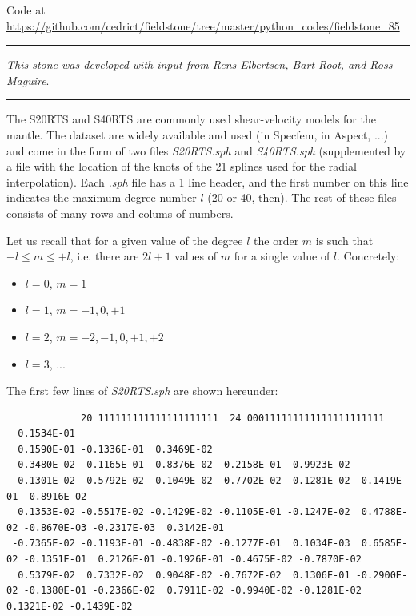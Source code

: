 
\begin{center}
Code at \url{https://github.com/cedrict/fieldstone/tree/master/python_codes/fieldstone_85}
\end{center}

\par\noindent\rule{\textwidth}{0.4pt}

{\sl This stone was developed with input from Rens Elbertsen, Bart Root, and Ross Maguire}. 

\par\noindent\rule{\textwidth}{0.4pt}

\vspace{1cm}



The S20RTS \cite{rivw99} and S40RTS \cite{ridv11} are commonly used shear-velocity models for the mantle.
The dataset are widely available and used (in Specfem, in Aspect, ...) and come in the form of two 
files {\sl S20RTS.sph} and {\sl S40RTS.sph} (supplemented by a file with the location of the knots of the 21 splines
used for the radial interpolation). 
Each {\sl .sph} file has a 1 line header, and the first number on this line indicates the maximum degree number $l$ 
(20 or 40, then). The rest of these files consists of many rows and colums of numbers.

Let us recall that for a given value of the degree $l$ the order $m$ is such that $-l \le m \le +l$, i.e. 
there are $2l+1$ values of $m$ for a single value of $l$. Concretely:
\begin{itemize}
\item $l=0$, $m=1$ 
\item $l=1$, $m=-1,0,+1$ 
\item $l=2$, $m=-2,-1,0,+1,+2$ 
\item $l=3$, ...
\end{itemize}
The first few lines of {\sl S20RTS.sph} are shown hereunder:
\begin{tiny}
\begin{verbatim}
             20 111111111111111111111  24 000111111111111111111111 
  0.1534E-01
  0.1590E-01 -0.1336E-01  0.3469E-02
 -0.3480E-02  0.1165E-01  0.8376E-02  0.2158E-01 -0.9923E-02
 -0.1301E-02 -0.5792E-02  0.1049E-02 -0.7702E-02  0.1281E-02  0.1419E-01  0.8916E-02
  0.1353E-02 -0.5517E-02 -0.1429E-02 -0.1105E-01 -0.1247E-02  0.4788E-02 -0.8670E-03 -0.2317E-03  0.3142E-01
 -0.7365E-02 -0.1193E-01 -0.4838E-02 -0.1277E-01  0.1034E-03  0.6585E-02 -0.1351E-01  0.2126E-01 -0.1926E-01 -0.4675E-02 -0.7870E-02
  0.5379E-02  0.7332E-02  0.9048E-02 -0.7672E-02  0.1306E-01 -0.2900E-02 -0.1380E-01 -0.2366E-02  0.7911E-02 -0.9940E-02 -0.1281E-02  0.1321E-02 -0.1439E-02
\end{verbatim}
\end{tiny}

